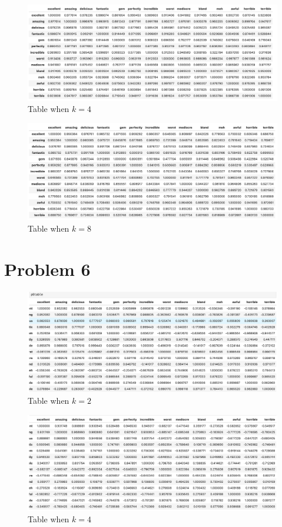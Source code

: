 \documentclass[11pt]{article}
\begin{document}
\begin{figure}[H]
    \centering
    \includegraphics[scale=0.4]{images/5b.png}
    \caption{Table when $k=4$}
\end{figure}

\begin{figure}[H]
    \centering
    \includegraphics[scale=0.4]{images/5c.png}
    \caption{Table when $k=8$}
\end{figure}

\newpage
\section*{Problem 6}
\begin{figure}[H]
    \centering
    \includegraphics[scale=0.4]{images/6a.png}
    \caption{Table when $k=2$}
\end{figure}

\begin{figure}[H]
    \centering
    \includegraphics[scale=0.4]{images/6b.png}
    \caption{Table when $k=4$}
\end{figure}
\end{document}
